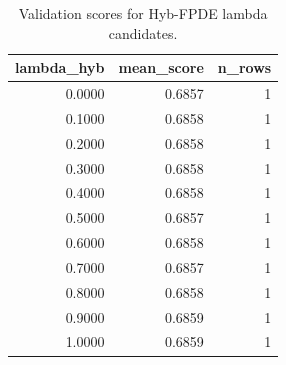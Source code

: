 \begin{table}[t]
\caption{Validation scores for Hyb-FPDE lambda candidates.}
\label{tab:lambda_distribution_computed}
\centering
\begin{tabular}{rrr}
\toprule
lambda\_hyb & mean\_score & n\_rows \\
\midrule
0.0000 & 0.6857 & 1 \\
0.1000 & 0.6858 & 1 \\
0.2000 & 0.6858 & 1 \\
0.3000 & 0.6858 & 1 \\
0.4000 & 0.6858 & 1 \\
0.5000 & 0.6857 & 1 \\
0.6000 & 0.6858 & 1 \\
0.7000 & 0.6857 & 1 \\
0.8000 & 0.6858 & 1 \\
0.9000 & 0.6859 & 1 \\
1.0000 & 0.6859 & 1 \\
\bottomrule
\end{tabular}

\end{table}
